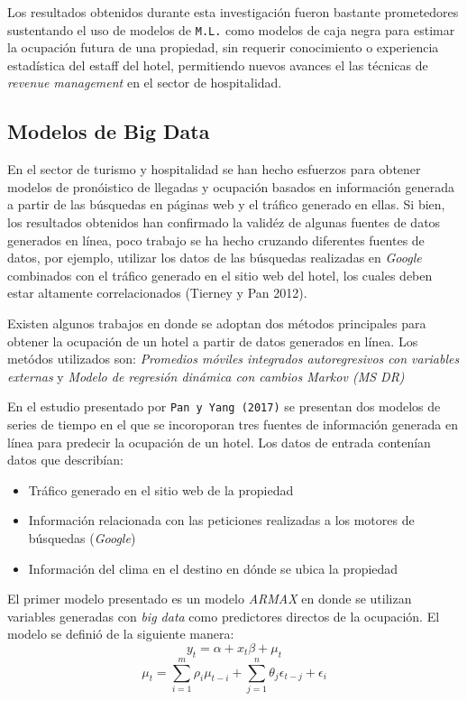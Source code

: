 {Los resultados obtenidos durante esta investigación fueron bastante prometedores sustentando el uso de modelos de \texttt{M.L.} como modelos de caja negra para estimar la ocupación futura de una propiedad, sin requerir conocimiento o experiencia estadística del estaff del hotel, permitiendo nuevos avances el las técnicas de \emph{revenue management} en el sector de hospitalidad.

\subsection*{Modelos de Big Data}

En el sector de turismo y hospitalidad se han hecho esfuerzos para obtener modelos de pronóistico de llegadas y ocupación basados en información generada a partir de las búsquedas en páginas web y el tráfico generado en ellas. Si bien, los resultados obtenidos han confirmado la validéz de algunas fuentes de datos generados en línea, poco trabajo se ha hecho cruzando diferentes fuentes de datos, por ejemplo, utilizar los datos de las búsquedas realizadas en \emph{Google} combinados con el tráfico generado en el sitio web del hotel, los cuales deben estar altamente correlacionados (Tierney y Pan 2012).

Existen algunos trabajos en donde se adoptan dos métodos principales para obtener la ocupación de un hotel a partir de datos generados en línea. Los metódos utilizados son: \emph{Promedios móviles integrados autoregresivos con variables externas} y \emph{Modelo de regresión dinámica con cambios Markov (MS DR)}

En el estudio presentado por \texttt{Pan y Yang (2017)} se presentan dos modelos de series de tiempo en el que se incoroporan tres fuentes de información generada en línea para predecir la ocupación de un hotel. Los datos de entrada contenían datos que describían:
\begin{itemize}
  \item Tráfico generado en el sitio web de la propiedad
  \item Información relacionada con las peticiones realizadas a los motores de búsquedas (\emph{Google})
  \item Información del clima en el destino en dónde se ubica la propiedad
\end{itemize}


El primer modelo presentado es un modelo \emph{ARMAX} en donde se utilizan variables generadas con \emph{big data} como predictores directos de la ocupación. El modelo se definió de la siguiente manera: $$y_t = \alpha + x_t \beta + \mu_t$$ $$\mu_t = \sum_{i=1}^{m} \rho_i \mu_{t-i} + \sum_{j=1}^{n} \theta_j \epsilon_{t-j} + \epsilon_i$$

}
